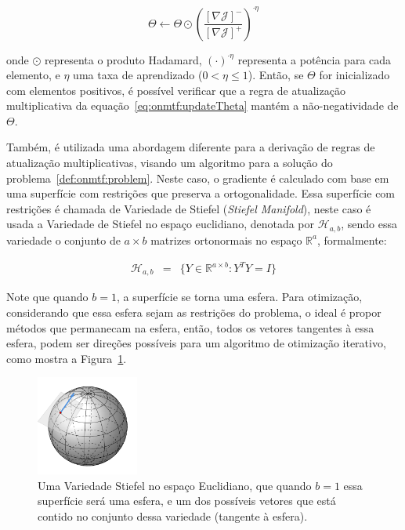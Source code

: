 \documentclass[
    12pt,                %
    oneside,            %
    a4paper,            %
    english,            %
    brazil                %
    ]{abntex2ppgsi}
\begin{document}
\begin{equation}
\label{eq:onmtf:updateTheta}
    \Theta \gets \Theta \odot \left ( \frac{ [\nabla \mathcal{J}]^- }{ [\nabla \mathcal{J}]^+ } \right )^{\cdot \eta}
\end{equation}

onde $\odot$ representa o produto Hadamard, $(\cdot)^{\cdot \eta}$ representa a potência para cada elemento, e $\eta$ uma taxa de aprendizado ($0 < \eta \leq 1$).
Então, se $\Theta$ for inicializado com elementos positivos, é possível verificar que a regra de atualização multiplicativa da equação~\ref{eq:onmtf:updateTheta} mantém a não-negatividade de $\Theta$.

Também, é utilizada uma abordagem diferente para a derivação de regras de atualização multiplicativas, visando um algoritmo para a solução do problema~\ref{def:onmtf:problem}.
Neste caso, o gradiente é calculado com base em uma superfície com restrições que preserva a ortogonalidade.
Essa superfície com restrições é chamada de Variedade de Stiefel (\textit{Stiefel Manifold}), neste caso é usada a Variedade de Stiefel no espaço euclidiano, denotada por $\mathcal{H}_{a,b}$, sendo essa variedade o conjunto de $a \times b$ matrizes ortonormais no espaço $\mathbb{R}^a$, formalmente:

\[
    \begin{array}{lclcl}
        \mathcal{H}_{a, b} & = & \{ Y \in \mathbb{R}^{a \times b}: Y^T Y = I \}
    \end{array}
\]

Note que quando $b = 1$, a superfície se torna uma esfera.
Para otimização, considerando que essa esfera sejam as restrições do problema, o ideal é propor métodos que permanecam na esfera, então, todos os vetores tangentes à essa esfera, podem ser direções possíveis para um algoritmo de otimização iterativo, como mostra a Figura~\ref{fig:stiefel}.

\begin{figure}[H]
\centering
    \includegraphics[width=0.3\textwidth]{img/stiefel.png}
    \caption{
        Uma Variedade Stiefel no espaço Euclidiano, que quando $b = 1$ essa superfície será uma esfera, e um dos possíveis vetores que está contido no conjunto dessa variedade (tangente à esfera).
    }
    \label{fig:stiefel}
\end{figure}
\end{document}
